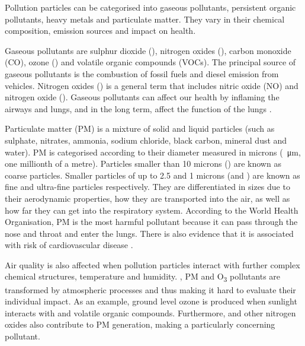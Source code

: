 Pollution particles can be categorised into gaseous pollutants, persistent organic pollutants, heavy metals and particulate matter. They vary in their chemical composition, emission sources and impact on health. 

Gaseous pollutants are sulphur dioxide (\SOTWO), nitrogen oxides (\NOX), carbon monoxide (CO), ozone (\OTHREE) and volatile organic compounds (VOCs). The principal source of gaseous pollutants is the combustion of fossil fuels and diesel emission from vehicles. Nitrogen oxides (\NOX) is a general term that includes nitric oxide (NO) and nitrogen oxide (\NOTWO). Gaseous pollutants can affect our health by inflaming the airways and lungs, and in the long term, affect the function of the lungs \cite{AirQualityExpertGroup2004} \cite{WHO2003}.

Particulate matter (PM) is a mixture of solid and liquid particles (such as sulphate, nitrates, ammonia, sodium chloride, black carbon, mineral dust and water). PM is categorised according to their diameter measured in microns (\SI{}{\micro\metre}, one millionth of a metre). Particles smaller than 10 microns (\PMTEN) are known as coarse particles. Smaller particles of up to 2.5 and 1 microns (\PMTWO and \PMONE) are known as fine and ultra-fine particles respectively. They are differentiated in sizes due to their aerodynamic properties, how they are transported into the air, as well as how far they can get into the respiratory system. According to the World Health Organisation, PM is the most harmful pollutant because it can pass through the nose and throat and enter the lungs. There is also evidence that it is associated with risk of cardiovascular disease \cite{Polichetti2009}. 

Air quality is also affected when pollution particles interact with further complex chemical structures, temperature and humidity. \NOTWO, PM and O\textsubscript{3}  pollutants are transformed by atmospheric processes and thus making it hard to evaluate their individual impact. As an example, ground level ozone is produced when sunlight interacts with \NOTWO and volatile organic compounds. Furthermore, \NOTWO and other nitrogen oxides also contribute to PM generation, making \NOX a particularly concerning pollutant.

